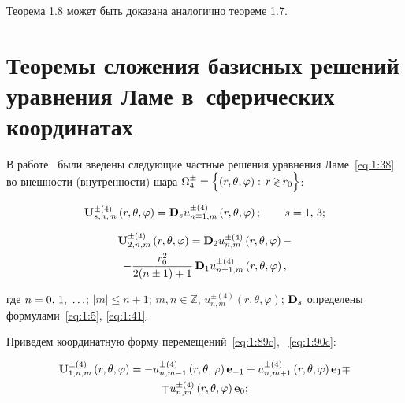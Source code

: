 Теорема 1.8 может быть доказана аналогично теореме 1.7.

\section[Теоремы сложения базисных решений уравнения Ламе в сферических координатах]{Теоремы сложения базисных решений уравнения Ламе в~сферических координатах}

В работе~\cite{Nikolaev1984} были введены следующие частные решения уравнения Ламе~\eqref{eq:1:38} во внешности (внутренности) шара $\Omega _4^ \pm  = \Big\{ {\left( {r,\theta ,\varphi } \right):{\mkern 1mu} {\kern 1pt} r \mathbin{\lower.3ex\hbox{$\buildrel>\over
{\smash{\scriptstyle<}\vphantom{_x}}$}} {r_0}} \Big\}$:

\begin{equation}\label{eq:1:89c}
{\bf{U}}_{s,n,m}^{ \pm (4)}\left( {r,\theta ,\varphi } \right) = {{\bf{D}}_s}u_{n \mp 1,m}^{ \pm (4)}\left( {r,\theta ,\varphi } \right);\qquad {\kern 1pt} s = 1,{\mkern 1mu} {\kern 1pt} 3;
\end{equation}

\begin{multline}\label{eq:1:90c}
{\bf{U}}_{2,n,m}^{ \pm (4)}\left( {r,\theta ,\varphi } \right) = {{\bf{D}}_2}u_{n,m}^{ \pm (4)}\left( {r,\theta ,\varphi } \right) - \\
- \frac{{r_0^2}}{{2(n \pm 1) + 1}}\,{{\bf{D}}_1}u_{n \pm 1,m}^{ \pm (4)}\left( {r,\theta ,\varphi } \right),
\end{multline}

\noindent где $n = 0,{\mkern 1mu} {\kern 1pt} 1,{\mkern 1mu} {\kern 1pt}  \ldots $; $|m| \le n + 1$; $m,n\in\mathbb{Z}$, $u_{n,m}^{ \pm (4)}\left( {r,\theta ,\varphi } \right)$; ${{\bf{D}}_s}$ определены формулами~\eqref{eq:1:5}, \eqref{eq:1:41}.

Приведем координатную форму перемещений~\eqref{eq:1:89c}, ~\eqref{eq:1:90c}:

\begin{multline}\label{eq:1:91}
{\bf{U}}_{1,n,m}^{ \pm (4)}\left( {r,\theta ,\varphi } \right) =  - u_{n,m - 1}^{ \pm (4)}\left( {r,\theta ,\varphi } \right){{\bf{e}}_{ - 1}} + u_{n,m + 1}^{ \pm (4)}\left( {r,\theta ,\varphi } \right){{\bf{e}}_1} \mp \\
\mp u_{n,m}^{ \pm (4)}\left( {r,\theta ,\varphi } \right){{\bf{e}}_0};
\end{multline}

